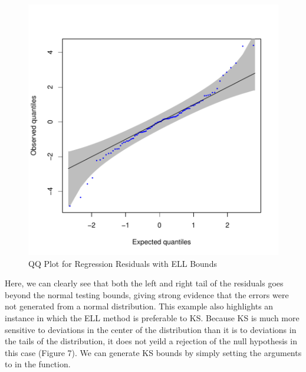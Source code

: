 \documentclass[article]{jss}
\begin{document}
\begin{Schunk}
\end{Schunk}

\begin{figure}
\begin{center}
\includegraphics{manuscript-qqconf_qqplot}
\end{center}
\caption{QQ Plot for Regression Residuals with ELL Bounds}
\end{figure}


Here, we can clearly see that both the left and right tail of the residuals goes beyond the normal testing bounds, giving strong evidence that the errors were not generated from a normal distribution.
\newline
\newline
This example also highlights an instance in which the ELL method is preferable to KS. Because KS is much more sensitive to deviations in the center of the distribution than it is to deviations in the tails of the distribution, it does not yeild a rejection of the null hypothesis in this case (Figure 7). We can generate KS bounds by simply setting the  arguments to  in the  function.
\end{document}
